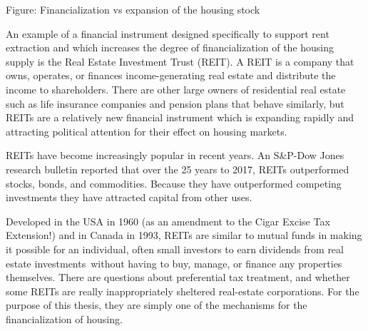\begin{center}
\end{center}

Figure: Financialization vs expansion of the housing stock 

An example of a financial instrument designed specifically to support rent extraction and which  increases the degree of financialization of the housing supply is the  Real Estate Investment Trust (REIT).  A REIT is a company that owns, operates, or finances income-generating real estate and distribute the income to shareholders. There are other large owners of residential real estate such as life insurance companies and pension plans that behave similarly, but REITs are a relatively new financial instrument which is  expanding rapidly and attracting political attention for their effect on housing markets.  %

REITs have become increasingly popular in recent years.  An S\&P-Dow Jones research bulletin reported that over the  25 years to 2017, REITs outperformed stocks, bonds, and commodities. Because they have outperformed competing investments they have attracted  capital from other uses.

Developed in the USA  in 1960 (as an amendment to the Cigar Excise Tax Extension!) and in Canada in 1993, REITs are similar to mutual funds in making it possible for an individual, often small investors to earn dividends from real estate investments without having to buy, manage, or finance any properties themselves. There are questions about preferential tax treatment, and whether some REITs are really inappropriately sheltered real-estate corporations.  For the purpose of this thesis, they are simply one of the mechanisms for the financialization of housing.

